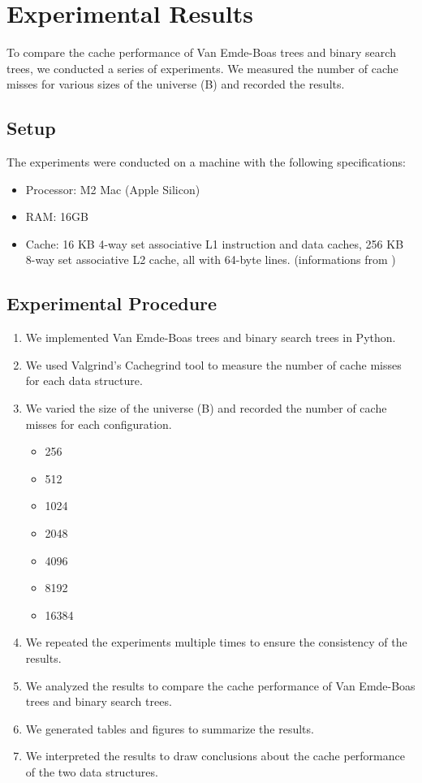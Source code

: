 \section{Experimental Results}

To compare the cache performance of Van Emde-Boas trees and binary search trees, we conducted a series of experiments. We measured the number of cache misses for various sizes of the universe (B) and recorded the results.

\subsection{Setup}

The experiments were conducted on a machine with the following specifications:
\begin{itemize}
    \item Processor: M2 Mac (Apple Silicon)
    \item RAM: 16GB
    \item Cache: 16 KB 4-way set associative L1 instruction and data caches, 256 KB 8-way set associative L2 cache, all with 64-byte lines. (informations from )
\end{itemize}

\subsection{Experimental Procedure}
\begin{enumerate}
    \item We implemented Van Emde-Boas trees and binary search trees in Python.
    \item We used Valgrind's Cachegrind tool to measure the number of cache misses for each data structure.
    \item We varied the size of the universe (B) and recorded the number of cache misses for each configuration.
        \begin{multicols}{2}
        \begin{itemize}
            \item 256
            \item 512
            \item 1024
            \item 2048
            \item 4096
            \item 8192
            \item 16384
        \end{itemize}
    \end{multicols}
    \item We repeated the experiments multiple times to ensure the consistency of the results.
    \item We analyzed the results to compare the cache performance of Van Emde-Boas trees and binary search trees.
    \item We generated tables and figures to summarize the results.
    \item We interpreted the results to draw conclusions about the cache performance of the two data structures.
\end{enumerate}

